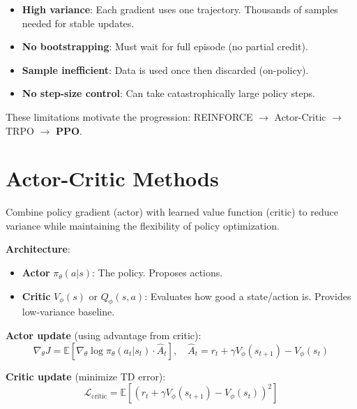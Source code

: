 \begin{warningbox}
\begin{itemize}
  \item \textbf{High variance}: Each gradient uses one trajectory. Thousands of samples needed for stable updates.
  \item \textbf{No bootstrapping}: Must wait for full episode (no partial credit).
  \item \textbf{Sample inefficient}: Data is used once then discarded (on-policy).
  \item \textbf{No step-size control}: Can take catastrophically large policy steps.
\end{itemize}

These limitations motivate the progression: REINFORCE $\to$ Actor-Critic $\to$ TRPO $\to$ \textbf{PPO}.
\end{warningbox}

\section{Actor-Critic Methods}
\label{actor-critic-methods}

Combine policy gradient (actor) with learned value function (critic) to reduce variance while maintaining the flexibility of policy optimization.

\textbf{Architecture}:

\begin{itemize}
  \item \textbf{Actor} $\pi_\theta(a|s)$: The policy. Proposes actions.
  \item \textbf{Critic} $V_\phi(s)$ or $Q_\phi(s,a)$: Evaluates how good a state/action is. Provides low-variance baseline.
\end{itemize}

\textbf{Actor update} (using advantage from critic): 
\begin{equation}
\nabla_\theta J = \mathbb{E}\left[\nabla_\theta \log \pi_\theta(a_t|s_t) \cdot \hat{A}_t\right], \quad \hat{A}_t = r_t + \gamma V_\phi(s_{t+1}) - V_\phi(s_t)
\end{equation}

\textbf{Critic update} (minimize TD error): 
\begin{equation}
\mathcal{L}_\text{critic} = \mathbb{E}\left[(r_t + \gamma V_\phi(s_{t+1}) - V_\phi(s_t))^2\right]
\end{equation}

